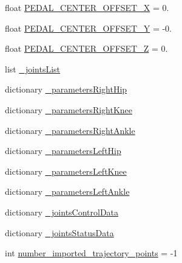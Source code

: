 \begin{DoxyCompactItemize}
\item 
float \mbox{\hyperlink{namespacejoint__angle__velocity__factor__test_a0cbc70b3c7851eb11a1027f9796484b6}{P\+E\+D\+A\+L\+\_\+\+C\+E\+N\+T\+E\+R\+\_\+\+O\+F\+F\+S\+E\+T\+\_\+X}} = 0.
\item 
float \mbox{\hyperlink{namespacejoint__angle__velocity__factor__test_abd71da1db22cd5b1876a908e129fe7ec}{P\+E\+D\+A\+L\+\_\+\+C\+E\+N\+T\+E\+R\+\_\+\+O\+F\+F\+S\+E\+T\+\_\+Y}} = -\/0.
\item 
float \mbox{\hyperlink{namespacejoint__angle__velocity__factor__test_a1ebf6fa995c8bc068e696b92cfe18302}{P\+E\+D\+A\+L\+\_\+\+C\+E\+N\+T\+E\+R\+\_\+\+O\+F\+F\+S\+E\+T\+\_\+Z}} = 0.
\item 
list \mbox{\hyperlink{namespacejoint__angle__velocity__factor__test_af67f95a4381bf76f4e732bb3828fab58}{\+\_\+joints\+List}}
\item 
dictionary \mbox{\hyperlink{namespacejoint__angle__velocity__factor__test_a64fe39abe3bfc23f32c4f4c39f5360cd}{\+\_\+parameters\+Right\+Hip}}
\item 
dictionary \mbox{\hyperlink{namespacejoint__angle__velocity__factor__test_aae76810c71676afb68b8bd28da1e2754}{\+\_\+parameters\+Right\+Knee}}
\item 
dictionary \mbox{\hyperlink{namespacejoint__angle__velocity__factor__test_a27327bf70e98f7b92d8743874a1baf64}{\+\_\+parameters\+Right\+Ankle}}
\item 
dictionary \mbox{\hyperlink{namespacejoint__angle__velocity__factor__test_a2c5be5ad02c54578c301c1438501344a}{\+\_\+parameters\+Left\+Hip}}
\item 
dictionary \mbox{\hyperlink{namespacejoint__angle__velocity__factor__test_a8b309d174e32e36154a1c9593eac5ecf}{\+\_\+parameters\+Left\+Knee}}
\item 
dictionary \mbox{\hyperlink{namespacejoint__angle__velocity__factor__test_a5d57a5db9ad64dc001ed11c1466565f0}{\+\_\+parameters\+Left\+Ankle}}
\item 
dictionary \mbox{\hyperlink{namespacejoint__angle__velocity__factor__test_a8085221f9b5a4227f50e66b0ff6eb67b}{\+\_\+joints\+Control\+Data}}
\item 
dictionary \mbox{\hyperlink{namespacejoint__angle__velocity__factor__test_af1d4789fa2edc65558a0ecffbae461af}{\+\_\+joints\+Status\+Data}}
\item 
int \mbox{\hyperlink{namespacejoint__angle__velocity__factor__test_af5d26f808e11fc4c98e64f95ecbfa935}{number\+\_\+imported\+\_\+trajectory\+\_\+points}} = -\/1
\item 

\end{DoxyCompactItemize}
